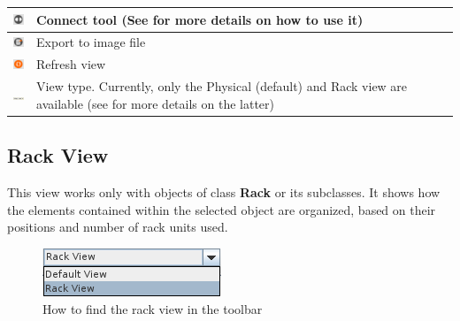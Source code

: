 \documentclass[a4paper]{article}
\begin{document}
\begin{table}[h!]
\begin{tabular}[h!]{lp{10cm}}
				\midrule
				\includegraphics[width=0.5cm]{img/icon_connect_tool.png} & Connect tool (See \textbf{\nameref{sec:physical_connections}} for more details on how to use it)\\
				\midrule
				\includegraphics[width=0.5cm]{img/icon_export.png} & Export to image file\\
				\midrule
				\includegraphics[width=0.5cm]{img/icon_refresh_view.png} & Refresh view\\
				\midrule
				\includegraphics[width=0.5cm]{img/icon_view_type.png} & View type. Currently, only the Physical (default) and Rack view are available (see \textbf{\nameref{sec:rack_view}} for more details on the latter)\\
			\end{tabular}
		\end{table}
		
		\subsection{Rack View} \label{sec:rack_view}
		This view works only with objects of class \textbf{Rack} or its subclasses. It shows how the elements contained within the selected object are organized, based on their positions and number of rack units used. 
		\begin{figure}[h!]
			\centering
			\includegraphics[width=0.2\linewidth]{img/rack_view_combobox.png}
			\caption{How to find the rack view in the toolbar}
			\label{fig:rack_view_combobox}
		\end{figure}
		
\end{document}
